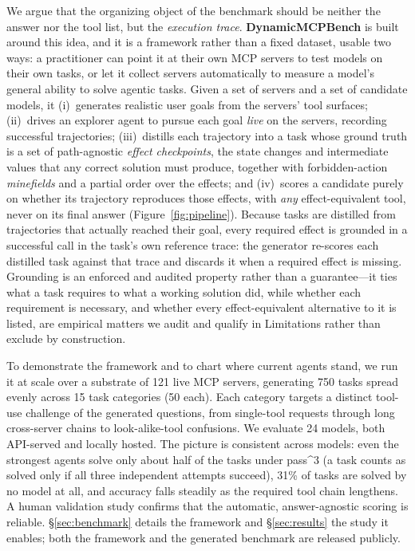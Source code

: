 We argue that the organizing object of the benchmark should be neither the
answer nor the tool list, but the \emph{execution trace}.
\textbf{DynamicMCPBench} is built around this idea, and it is a
framework rather than a fixed dataset, usable two ways: a practitioner can point it
at their own MCP servers to test models on their own tasks, or let
it collect servers automatically to measure a model's general
ability to solve agentic tasks. Given a set of servers and a set of
candidate models, it
(i)~generates realistic user goals from the servers' tool surfaces;
(ii)~drives an explorer agent to pursue each goal \emph{live} on the
servers, recording successful trajectories; (iii)~distills each trajectory
into a task whose ground truth is a set of path-agnostic \emph{effect
checkpoints}, the state changes and intermediate values that any correct
solution must produce, together with forbidden-action \emph{minefields}
and a partial order over the effects; and (iv)~scores a candidate purely on
whether its trajectory reproduces those effects, with \emph{any}
effect-equivalent tool, never on its final answer
(Figure~\ref{fig:pipeline}). Because tasks are distilled from trajectories
that actually reached their goal, every required effect is grounded in a
successful call in the task's own reference trace: the generator re-scores
each distilled task against that trace and discards it when a required effect
is missing. Grounding is an enforced and audited property rather than a
guarantee---it ties what a task requires to what a working solution did, while
whether each requirement is necessary, and whether every effect-equivalent
alternative to it is listed, are empirical matters we audit and qualify in
Limitations rather than exclude by construction.


To demonstrate the framework and to chart where current agents
stand, we run it at scale over a substrate of 121 live MCP servers,
generating 750 tasks spread evenly across 15 task categories (50
each). Each category targets a distinct tool-use challenge of the
generated questions, from single-tool requests through long cross-server
chains to look-alike-tool confusions. We evaluate 24 models, both
API-served and locally hosted. The picture is
consistent across models: even the strongest agents solve only about half
of the tasks under pass\textasciicircum{}3 (a task counts as solved only if all
three independent attempts succeed), 31\% of tasks are solved by no model
at all, and accuracy falls steadily as the required tool chain lengthens. A
human validation study confirms that the automatic, answer-agnostic scoring
is reliable. \S\ref{sec:benchmark} details the framework and
\S\ref{sec:results} the study it enables; both the framework and the generated
benchmark are released publicly.
